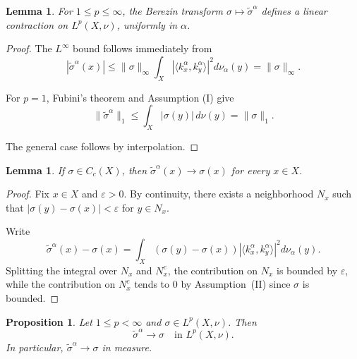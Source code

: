 \documentclass{amsart}
\newtheorem{prop}[thm]{Proposition}
\newtheorem{lem}[thm]{Lemma}
\theoremstyle{definition}
\theoremstyle{remark}
\numberwithin{equation}{section}
\begin{document}
\begin{lem}
For $1 \le p \le \infty$, the Berezin transform
$\sigma \mapsto \widetilde{\sigma}^\alpha$
defines a linear contraction on $L^p(X,\nu)$,
uniformly in $\alpha$.
\end{lem}

\begin{proof}
The $L^\infty$ bound follows immediately from
\[
    |\widetilde{\sigma}^\alpha(x)|
    \le
    \|\sigma\|_\infty
    \int_X
    |\langle k_x^\alpha,k_y^\alpha\rangle|^2
    d\nu_\alpha(y)
    =
    \|\sigma\|_\infty.
\]

For $p=1$, Fubini's theorem and Assumption (I) give
\[
    \|\widetilde{\sigma}^\alpha\|_1
    \le
    \int_X |\sigma(y)|\, d\nu(y)
    =
    \|\sigma\|_1.
\]

The general case follows by interpolation.
\end{proof}



\begin{lem}
If $\sigma \in C_c(X)$, then
$\widetilde{\sigma}^\alpha(x) \to \sigma(x)$
for every $x\in X$.
\end{lem}

\begin{proof}
Fix $x\in X$ and $\varepsilon>0$.
By continuity, there exists a neighborhood $N_x$
such that $|\sigma(y)-\sigma(x)|<\varepsilon$
for $y\in N_x$.

Write
\[
    \widetilde{\sigma}^\alpha(x)-\sigma(x)
    =
    \int_X
    (\sigma(y)-\sigma(x))
    |\langle k_x^\alpha,k_y^\alpha\rangle|^2
    d\nu_\alpha(y).
\]
Splitting the integral over $N_x$ and $N_x^c$,
the contribution on $N_x$ is bounded by $\varepsilon$,
while the contribution on $N_x^c$
tends to $0$ by Assumption~(II)
since $\sigma$ is bounded.
\end{proof}


\begin{prop}\label{Lp}
Let $1 \le p < \infty$ and $\sigma \in L^p(X,\nu)$.
Then
\[
    \widetilde{\sigma}^\alpha \to \sigma
    \quad \text{in } L^p(X,\nu).
\]
In particular, $\widetilde{\sigma}^\alpha \to \sigma$
in measure.
\end{prop}
\end{document}
